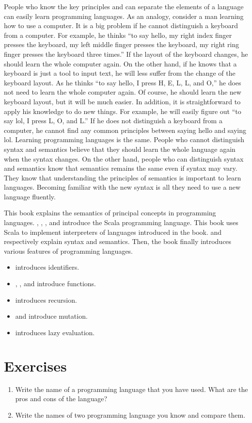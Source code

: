 People who know the key principles and can separate the elements of a language
can easily learn programming languages. As an analogy, consider a man learning
how to use a computer. It is a big problem if he cannot distinguish a keyboard
from a computer. For example, he thinks ``to say hello, my right index finger
presses the keyboard, my left middle finger presses the keyboard, my right ring
finger presses the keyboard three times.'' If the layout of the keyboard changes,
he should learn the whole computer again. On the other hand, if he knows that a
keyboard is just a tool to input text, he will less suffer from the change of
the keyboard layout. As he thinks ``to say hello, I press H, E, L, L, and O,'' he
does not need to learn the whole computer again. Of course, he should learn the
new keyboard layout, but it will be much easier. In addition, it is
straightforward to apply his knowledge to do new things. For example, he will
easily figure out ``to say lol, I press L, O, and L.'' If he does not distinguish
a keyboard from a computer, he cannot find any common principles between saying
hello and saying lol. Learning programming languages is the same. People who
cannot distinguish syntax and semantics believe that they should learn the whole
language again when the syntax changes. On the other hand, people who can
distinguish syntax and semantics know that semantics remains the same even if
syntax may vary. They know that understanding the principles of semantics is
important to learn languages. Becoming familiar with the
new syntax is all they need to use a new language fluently.

This book explains the semantics of principal concepts in programming languages.
, ,
, and 
introduce the Scala programming language. This book
uses Scala to implement interpreters of languages introduced in the book.
 and  respectively explain syntax and
semantics. Then, the book finally introduces various features of programming languages.
\begin{itemize}
    \item {} introduces identifiers.
    \item {},
      , and  introduce functions.
    \item {} introduces recursion.
    \item {} and  introduce mutation.
    \item {} introduces lazy evaluation.
\end{itemize}

\section{Exercises}

\begin{enumerate}
\item Write the name of a programming language that you have used.
  What are the pros and cons of the language?
\item Write the names of two programming language you know and compare them.
\end{enumerate}
